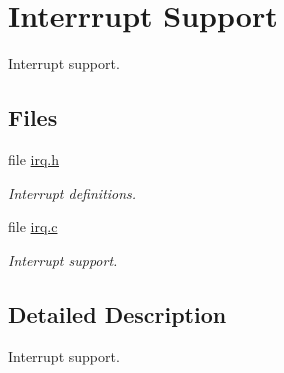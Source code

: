 \hypertarget{group__raspberrypi__interrupt}{}\section{Interrrupt Support}
\label{group__raspberrypi__interrupt}


Interrupt support.  


\subsection*{Files}
\begin{DoxyCompactItemize}
\item 
file \mbox{\hyperlink{bsps_2arm_2raspberrypi_2include_2bsp_2irq_8h}{irq.\+h}}
\begin{DoxyCompactList}\small\item\em Interrupt definitions. \end{DoxyCompactList}\item 
file \mbox{\hyperlink{bsps_2arm_2raspberrypi_2irq_2irq_8c}{irq.\+c}}
\begin{DoxyCompactList}\small\item\em Interrupt support. \end{DoxyCompactList}\end{DoxyCompactItemize}


\subsection{Detailed Description}
Interrupt support. 

